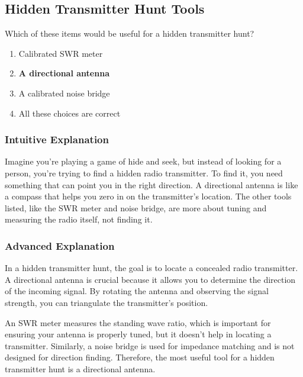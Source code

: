 \subsection{Hidden Transmitter Hunt Tools}
\label{T8C02}

\begin{tcolorbox}[colback=gray!10!white,colframe=black!75!black,title=T8C02]
Which of these items would be useful for a hidden transmitter hunt?
\begin{enumerate}[noitemsep]
    \item Calibrated SWR meter
    \item \textbf{A directional antenna}
    \item A calibrated noise bridge
    \item All these choices are correct
\end{enumerate}
\end{tcolorbox}

\subsubsection*{Intuitive Explanation}
Imagine you're playing a game of hide and seek, but instead of looking for a person, you're trying to find a hidden radio transmitter. To find it, you need something that can point you in the right direction. A directional antenna is like a compass that helps you zero in on the transmitter's location. The other tools listed, like the SWR meter and noise bridge, are more about tuning and measuring the radio itself, not finding it.

\subsubsection*{Advanced Explanation}
In a hidden transmitter hunt, the goal is to locate a concealed radio transmitter. A directional antenna is crucial because it allows you to determine the direction of the incoming signal. By rotating the antenna and observing the signal strength, you can triangulate the transmitter's position. 

An SWR meter measures the standing wave ratio, which is important for ensuring your antenna is properly tuned, but it doesn't help in locating a transmitter. Similarly, a noise bridge is used for impedance matching and is not designed for direction finding. Therefore, the most useful tool for a hidden transmitter hunt is a directional antenna.